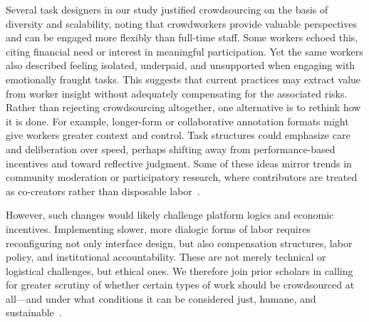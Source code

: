 Several task designers in our study justified crowdsourcing on the basis of diversity and scalability, noting that crowdworkers provide valuable perspectives and can be engaged more flexibly than full-time staff. Some workers echoed this, citing financial need or interest in meaningful participation. Yet the same workers also described feeling isolated, underpaid, and unsupported when engaging with emotionally fraught tasks. This suggests that current practices may extract value from worker insight without adequately compensating for the associated risks. Rather than rejecting crowdsourcing altogether, one alternative is to rethink how it is done. For example, longer-form or collaborative annotation formats might give workers greater context and control. Task structures could emphasize care and deliberation over speed, perhaps shifting away from performance-based incentives and toward reflective judgment. Some of these ideas mirror trends in community moderation or participatory research, where contributors are treated as co-creators rather than disposable labor~\cite{wang2022whose}.

However, such changes would likely challenge platform logics and economic incentives. Implementing slower, more dialogic forms of labor requires reconfiguring not only interface design, but also compensation structures, labor policy, and institutional accountability. These are not merely technical or logistical challenges, but ethical ones. We therefore join prior scholars in calling for greater scrutiny of whether certain types of work should be crowdsourced at all—and under what conditions it can be considered just, humane, and sustainable~. 
